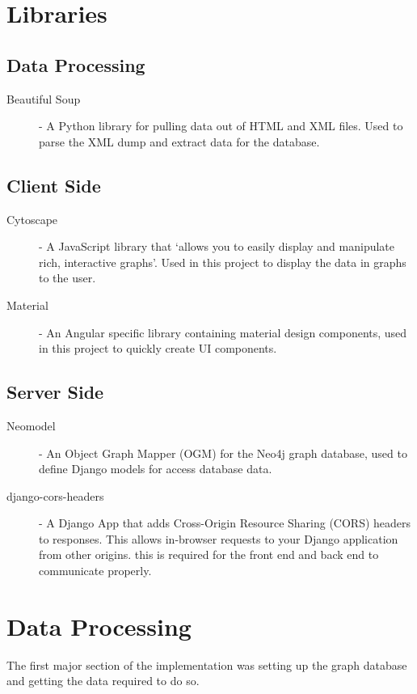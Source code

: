 \section{Libraries}
\subsection{Data Processing}
\begin{description}
    \item[Beautiful Soup] - A Python library for pulling data out of HTML and XML files\cite{BeautifulSoupDocumentation}. 
    Used to parse the XML dump and extract data for the database.
\end{description}
\subsection{Client Side}
\begin{description}
    \item[Cytoscape] - A JavaScript library that `allows you to easily display and manipulate rich, interactive graphs'\cite{franzCytoscapeJsGraph2016}. 
    Used in this project to display the data in graphs to the user.
    \item[Material] - An Angular specific library containing material design components, used in this project to quickly create UI components.
\end{description}
\subsection{Server Side}
\begin{description}
    \item[Neomodel] - An Object Graph Mapper (OGM) for the Neo4j graph database\cite{NeomodelDocumentationNeomodel}, used to define Django models for access database data.
    \item[django-cors-headers] - A Django App that adds Cross-Origin Resource Sharing (CORS) headers to responses. This allows in-browser requests to your Django application from other origins.\cite{yiuDjangocorsheadersDjangocorsheadersDjango} 
    this is required for the front end and back end to communicate properly.
\end{description}
\section{Data Processing}
The first major section of the implementation was setting up the graph database and getting the data required to do so.

